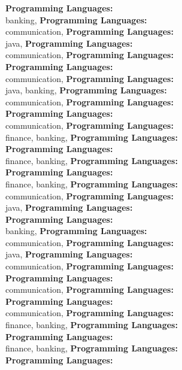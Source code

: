 \textbf{Programming Languages:} \\
banking, \textbf{Programming Languages:} \\
communication, \textbf{Programming Languages:} \\
java, \textbf{Programming Languages:} \\
communication, \textbf{Programming Languages:} \\
\textbf{Programming Languages:} \\
communication, \textbf{Programming Languages:} \\
java, banking, \textbf{Programming Languages:} \\
communication, \textbf{Programming Languages:} \\
\textbf{Programming Languages:} \\
communication, \textbf{Programming Languages:} \\
finance, banking, \textbf{Programming Languages:} \\
\textbf{Programming Languages:} \\
finance, banking, \textbf{Programming Languages:} \\
\textbf{Programming Languages:} \\
finance, banking, \textbf{Programming Languages:} \\
communication, \textbf{Programming Languages:} \\
java, \textbf{Programming Languages:} \\
\textbf{Programming Languages:} \\
banking, \textbf{Programming Languages:} \\
communication, \textbf{Programming Languages:} \\
java, \textbf{Programming Languages:} \\
communication, \textbf{Programming Languages:} \\
\textbf{Programming Languages:} \\
communication, \textbf{Programming Languages:} \\
\textbf{Programming Languages:} \\
communication, \textbf{Programming Languages:} \\
finance, banking, \textbf{Programming Languages:} \\
\textbf{Programming Languages:} \\
finance, banking, \textbf{Programming Languages:} \\
\textbf{Programming Languages:} \\
